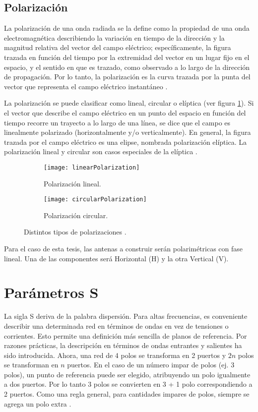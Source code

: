 \subsection{Polarización} \label{sc:polarization}

La polarización de una onda radiada se la define como la propiedad de una onda electromagnética describiendo la variación en tiempo de la dirección y la magnitud relativa del vector del campo eléctrico; específicamente, la figura trazada en función del tiempo por la extremidad del vector en un lugar fijo en el espacio, y el sentido en que es trazado, como observado a lo largo de la dirección de propagación. Por lo tanto, la polarización es la curva trazada por la punta del vector que representa el campo eléctrico instantáneo \cite{Balanis2012}.

La polarización se puede clasificar como lineal, circular o elíptica (ver figura \ref{fig:hvPolarizations}). Si el vector que describe el campo eléctrico en un punto del espacio en función del tiempo recorre un trayecto a lo largo de una línea, se dice que el campo es linealmente polarizado (horizontalmente y/o verticalmente). En general, la figura trazada por el campo eléctrico es una elipse, nombrada polarización elíptica. La polarización lineal y circular son casos especiales de la elíptica \cite{Vita2012}.

\begin{figure}[H]
  \centering
  \begin{subfigure}[b]{0.49\textwidth}
    \texttt{[image: linearPolarization]}
    \caption{Polarización lineal.}
  \end{subfigure}
  \begin{subfigure}[b]{0.49\textwidth}
    \texttt{[image: circularPolarization]}
    \caption{Polarización circular.}
  \end{subfigure}
  \caption{Distintos tipos de polarizaciones \cite{Hecht2002}.}
  \label{fig:hvPolarizations}
\end{figure}

Para el caso de esta tesis, las antenas a construir serán polarimétricas con fase lineal. Una de las componentes será Horizontal (H) y la otra Vertical (V).


\section{Parámetros S} 

La sigla S deriva de la palabra dispersión. Para altas frecuencias, es conveniente describir una determinada red en términos de ondas en vez de tensiones o corrientes. Esto permite una definición más sencilla de planos de referencia. Por razones prácticas, la descripción en términos de ondas entrantes y salientes ha sido introducida. Ahora, una red de 4 polos se transforma en 2 puertos y $2n$ polos se transforman en $n$ puertos. En el caso de un número impar de polos (ej. 3 polos), un punto de referencia puede ser elegido, atribuyendo un polo igualmente a dos puertos. Por lo tanto 3 polos se convierten en 3 + 1 polo correspondiendo a 2 puertos. Como una regla general, para cantidades impares de polos, siempre se agrega un polo extra \cite{Caspers}.

